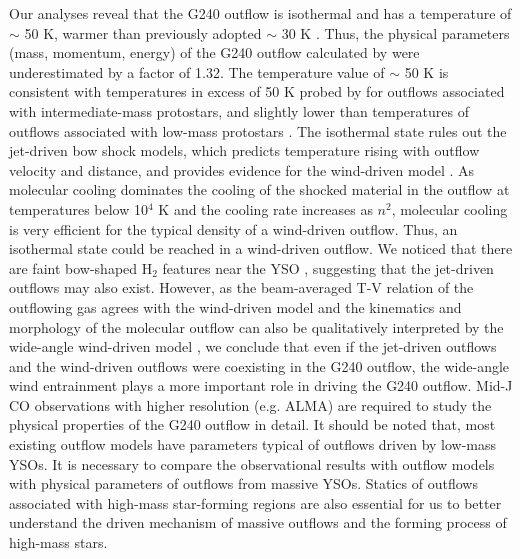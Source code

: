 Our analyses reveal that the G240 outflow is isothermal and has a temperature of $\sim$ 50 K, warmer than previously adopted $\sim$ 30 K \citep{2009ApJ...696...66Q}. Thus, the physical parameters (mass, momentum, energy) of the G240 outflow calculated by \citet{2009ApJ...696...66Q} were underestimated by a factor of 1.32. The temperature value of $\sim$ 50 K is consistent with temperatures in excess of 50 K probed by \citet{2016A&A...587A..17V} for outflows associated with intermediate-mass protostars, and slightly lower than temperatures of outflows associated with low-mass protostars \citep{2009A&A...501..633V, 2012A&A...542A..86Y}. The isothermal state rules out the jet-driven bow shock models, which predicts temperature rising with outflow velocity and distance, and provides evidence for the wind-driven model \citep{2007prpl.conf..245A}. As molecular cooling dominates the cooling of the shocked material in the outflow at temperatures below 10$^4$ K \citep{1997IAUS..182..181H} and the cooling rate increases as $n^2$, molecular cooling is very efficient for the typical density of a wind-driven outflow. Thus, an isothermal state could be reached in a wind-driven outflow. We noticed that there are faint bow-shaped H$_{2}$ features near the YSO , suggesting that the jet-driven outflows may also exist. However, as the beam-averaged T-V relation of the outflowing gas agrees with the wind-driven model and the kinematics and morphology of the molecular outflow can also be qualitatively interpreted by the wide-angle wind-driven model \citep{2009ApJ...696...66Q}, we conclude that even if the jet-driven outflows and the wind-driven outflows were coexisting in the G240 outflow, the wide-angle wind entrainment plays a more important role in driving the G240 outflow. Mid-J CO observations with higher resolution (e.g. ALMA) are required to study the physical properties of the G240 outflow in detail. It should be noted that, most existing outflow models have parameters typical of outflows driven by low-mass YSOs. It is necessary to compare the observational results with outflow models with physical parameters of outflows from massive YSOs. Statics of outflows associated with high-mass star-forming regions are also essential for us to better understand the driven mechanism of massive outflows and the forming process of high-mass stars.


